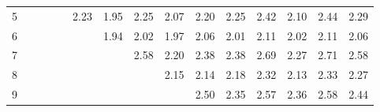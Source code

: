 \documentclass[a4paper, 11pt, ngerman]{article}
\theoremstyle{definition}
\theoremstyle{plain}
\theoremstyle{remark}
\begin{document}
\begin{figure}
\begin{tabular}{c|cccccccccccccc}
        5                    &                                  &                                  &                                  &                                  & \textcolor[HTML]{ 91206d }{2.23} & \textcolor[HTML]{ 70208e }{1.95} & \textcolor[HTML]{ 93206b }{2.25} & \textcolor[HTML]{ 7e2080 }{2.07} & \textcolor[HTML]{ 8d2071 }{2.20} & \textcolor[HTML]{ 93206b }{2.25} & \textcolor[HTML]{ a72057 }{2.42} & \textcolor[HTML]{ 82207c }{2.10} & \textcolor[HTML]{ a92055 }{2.44} & \textcolor[HTML]{ 982066 }{2.29} \\
        6                    &                                  &                                  &                                  &                                  &                                  & \textcolor[HTML]{ 6f208f }{1.94} & \textcolor[HTML]{ 782086 }{2.02} & \textcolor[HTML]{ 73208b }{1.97} & \textcolor[HTML]{ 7d2081 }{2.06} & \textcolor[HTML]{ 772087 }{2.01} & \textcolor[HTML]{ 82207c }{2.11} & \textcolor[HTML]{ 782086 }{2.02} & \textcolor[HTML]{ 83207b }{2.11} & \textcolor[HTML]{ 7d2081 }{2.06} \\
        7                    &                                  &                                  &                                  &                                  &                                  &                                  & \textcolor[HTML]{ ba2044 }{2.58} & \textcolor[HTML]{ 8d2071 }{2.20} & \textcolor[HTML]{ a3205b }{2.38} & \textcolor[HTML]{ a2205c }{2.38} & \textcolor[HTML]{ c72037 }{2.69} & \textcolor[HTML]{ 962068 }{2.27} & \textcolor[HTML]{ c92035 }{2.71} & \textcolor[HTML]{ ba2044 }{2.58} \\
        8                    &                                  &                                  &                                  &                                  &                                  &                                  &                                  & \textcolor[HTML]{ 872077 }{2.15} & \textcolor[HTML]{ 862078 }{2.14} & \textcolor[HTML]{ 8b2073 }{2.18} & \textcolor[HTML]{ 9b2063 }{2.32} & \textcolor[HTML]{ 852079 }{2.13} & \textcolor[HTML]{ 9c2062 }{2.33} & \textcolor[HTML]{ 952069 }{2.27} \\
        9                    &                                  &                                  &                                  &                                  &                                  &                                  &                                  &                                  & \textcolor[HTML]{ b0204e }{2.50} & \textcolor[HTML]{ 9f205f }{2.35} & \textcolor[HTML]{ b92045 }{2.57} & \textcolor[HTML]{ a0205e }{2.36} & \textcolor[HTML]{ ba2044 }{2.58} & \textcolor[HTML]{ aa2054 }{2.44} \\

\end{tabular}
\end{figure}
\end{document}
